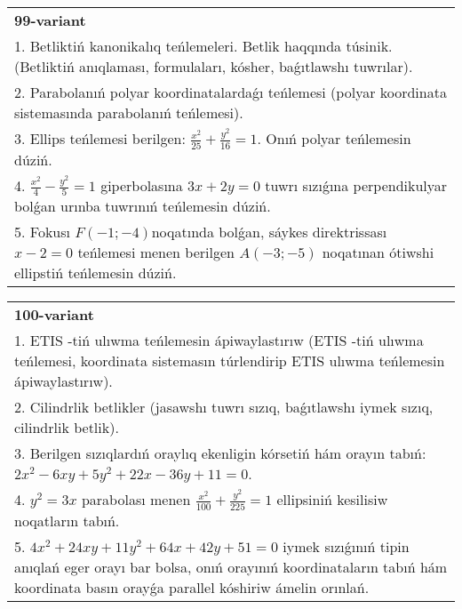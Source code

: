 \documentclass{article}
\begin{document}
\begin{tabular}{m{17cm}}
\textbf{99-variant}\\
1. Betliktiń kanonikalıq teńlemeleri. Betlik haqqında túsinik. (Betliktiń anıqlaması, formulaları, kósher, baǵıtlawshı tuwrılar).\\

2. Parabolanıń polyar koordinatalardaǵı teńlemesi (polyar koordinata sistemasında parabolanıń teńlemesi).\\

3. Ellips teńlemesi berilgen: $\frac{x^2}{25}+\frac{y^2}{16}=1$. Onıń polyar teńlemesin dúziń.\\

4. $\frac{x^{2}}{4} - \frac{y^{2}}{5} = 1$ giperbolasına $3x + 2y = 0$ tuwrı sızıǵına perpendikulyar bolǵan urınba tuwrınıń teńlemesin dúziń.\\

5. Fokusı $F( - 1; - 4)$noqatında bolǵan, sáykes direktrissası $x - 2 = 0$ teńlemesi menen berilgen $A( - 3; - 5)$ noqatınan ótiwshi ellipstiń teńlemesin dúziń.  
\end{tabular}
\vspace{1cm}


\begin{tabular}{m{17cm}}
\textbf{100-variant}\\
1. ETIS -tiń ulıwma teńlemesin ápiwaylastırıw (ETIS -tiń ulıwma teńlemesi, koordinata sistemasın túrlendirip ETIS ulıwma teńlemesin ápiwaylastırıw).\\

2. Cilindrlik betlikler (jasawshı tuwrı sızıq, baǵıtlawshı iymek sızıq, cilindrlik betlik).\\

3. Berilgen sızıqlardıń oraylıq ekenligin kórsetiń hám orayın tabıń: $2 x^{2}-6 xy+5 y^{2}+22 x-36 y+11=0$.\\

4. $y^{2} = 3x$ parabolası menen $\frac{x^{2}}{100} + \frac{y^{2}}{225} = 1$ ellipsiniń kesilisiw noqatların tabıń.  \\

5. $4x^{2} + 24xy + 11y^{2} + 64x + 42y + 51 = 0$ iymek sızıǵınıń tipin anıqlań eger orayı bar bolsa, onıń orayınıń koordinataların tabıń hám koordinata basın orayǵa parallel kóshiriw ámelin orınlań.  
\end{tabular}
\vspace{1cm}
\end{document}
